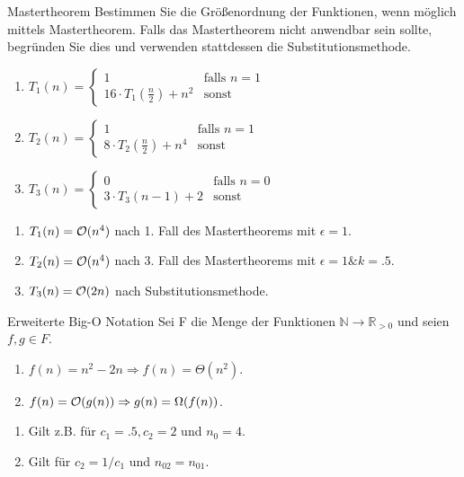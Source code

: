 \documentclass{article}
\begin{document}
\begin{exercise}{Mastertheorem}
  Bestimmen Sie die Größenordnung der Funktionen, wenn möglich mittels Mastertheorem. Falls das Mastertheorem nicht anwendbar sein sollte, begründen Sie dies und verwenden stattdessen die Substitutionsmethode.
  \begin{enumerate}
    \item $T_1(n) = \begin{cases}
              1                               & \text{falls } n = 1 \\
              16 \cdot T_1(\frac{n}{2}) + n^2 & \text{sonst}
            \end{cases}$
    \item $T_2(n) = \begin{cases}
              1                              & \text{falls } n = 1 \\
              8 \cdot T_2(\frac{n}{2}) + n^4 & \text{sonst}
            \end{cases}$
    \item $T_3(n) = \begin{cases}
              0                    & \text{falls } n = 0 \\
              3 \cdot T_3(n-1) + 2 & \text{sonst}
            \end{cases}$
  \end{enumerate}

  \begin{solution}
    \begin{enumerate}
      \item $T_1(n) = \mathcal{O}(n^4)$ nach 1. Fall des Mastertheorems mit $\epsilon=1$.
      \item $T_2(n) = \mathcal{O}(n^4)$ nach 3. Fall des Mastertheorems mit $\epsilon=1 \& k=.5$.
      \item $T_3(n) = \mathcal{O}(2n)$ nach Substitutionsmethode.
    \end{enumerate}
  \end{solution}
\end{exercise}

\begin{exercise}{Erweiterte Big-O Notation}
  Sei F die Menge der Funktionen $\mathbb{N} \rightarrow \mathbb{R}_{>0}$ und seien $f, g \in F$.
  \begin{enumerate}
    \item $f(n)=n^2-2n \Rightarrow f(n)=\Theta(n^2)$.
    \item $f(n)=\mathcal{O}(g(n)) \Rightarrow g(n)=\Omega(f(n))$.
  \end{enumerate}

  \begin{solution}
    \begin{enumerate}
      \item Gilt z.B. für $c_1=.5, c_2=2$ und $n_0=4$.
      \item Gilt für $c_2=1/c_1$ und $n_{02}=n_{01}$.
    \end{enumerate}
  \end{solution}
\end{exercise}
\end{document}
